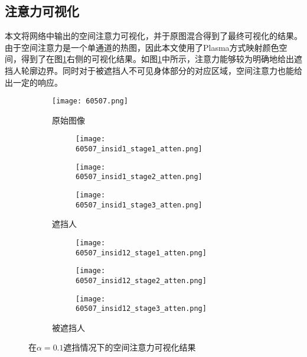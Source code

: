 \subsection{注意力可视化}
\label{sec:weaksuperatten}
本文将网络中输出的空间注意力可视化，并于原图混合得到了最终可视化的结果。由于空间注意力是一个单通道的热图，因此本文使用了Plasma方式映射颜色空间，得到了在图\ref{fig:attenvis}右侧的可视化结果。如图\ref{fig:attenvis}中所示，注意力能够较为明确地给出遮挡人轮廓边界。同时对于被遮挡人不可见身体部分的对应区域，空间注意力也能给出一定的响应。

\begin{figure}[h]
	\centering
	\begin{subfigure}{0.3\linewidth}
		\texttt{[image: 60507.png]}
		\caption{原始图像}
	\end{subfigure}
	\begin{subfigure}{0.3\textwidth}
		\centering
		\begin{subfigure}{\linewidth}
			\texttt{[image: 60507\_insid1\_stage1\_atten.png]}
		\end{subfigure}
		\vskip2pt
		\begin{subfigure}{\linewidth}
			\texttt{[image: 60507\_insid1\_stage2\_atten.png]}
		\end{subfigure}
		\vskip2pt
		\begin{subfigure}{\linewidth}
			\texttt{[image: 60507\_insid1\_stage3\_atten.png]}
		\end{subfigure}
		\caption{遮挡人}
	\end{subfigure}
	\begin{subfigure}{0.3\textwidth}
		\centering
		\begin{subfigure}{\linewidth}
			\texttt{[image: 60507\_insid12\_stage1\_atten.png]}
		\end{subfigure}
		\vskip2pt
		\begin{subfigure}{\linewidth}
			\texttt{[image: 60507\_insid12\_stage2\_atten.png]}
		\end{subfigure}
		\vskip2pt
		\begin{subfigure}{\linewidth}
			\texttt{[image: 60507\_insid12\_stage3\_atten.png]}
		\end{subfigure}
		\caption{被遮挡人}
	\end{subfigure}
	\begin{minipage}{0.05\linewidth}
		
		\vskip2cm
		
		\vskip2cm
	\end{minipage}
	\caption{在$\alpha=0.1$遮挡情况下的空间注意力可视化结果}
	\label{fig:attenvis}
\end{figure}

